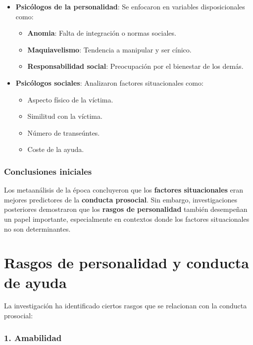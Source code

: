 \documentclass[
]{book}
\providecommand{\tightlist}{%
  \setlength{\itemsep}{0pt}\setlength{\parskip}{0pt}}
\begin{document}
\begin{itemize}
\tightlist
\item
  \textbf{Psicólogos de la personalidad}: Se enfocaron en variables disposicionales como:

  \begin{itemize}
  \tightlist
  \item
    \textbf{Anomia}: Falta de integración o normas sociales.
  \item
    \textbf{Maquiavelismo}: Tendencia a manipular y ser cínico.
  \item
    \textbf{Responsabilidad social}: Preocupación por el bienestar de los demás.
  \end{itemize}
\item
  \textbf{Psicólogos sociales}: Analizaron factores situacionales como:

  \begin{itemize}
  \tightlist
  \item
    Aspecto físico de la víctima.
  \item
    Similitud con la víctima.
  \item
    Número de transeúntes.
  \item
    Coste de la ayuda.
  \end{itemize}
\end{itemize}

\subsubsection{Conclusiones iniciales}\label{conclusiones-iniciales}

Los metaanálisis de la época concluyeron que los \textbf{factores situacionales} eran mejores predictores de la \textbf{conducta prosocial}. Sin embargo, investigaciones posteriores demostraron que los \textbf{rasgos de personalidad} también desempeñan un papel importante, especialmente en contextos donde los factores situacionales no son determinantes.

\section{Rasgos de personalidad y conducta de ayuda}\label{rasgos-de-personalidad-y-conducta-de-ayuda}

La investigación ha identificado ciertos rasgos que se relacionan con la conducta prosocial:

\subsubsection{\texorpdfstring{1. \textbf{Amabilidad}}{1. Amabilidad}}\label{amabilidad}
\end{document}
